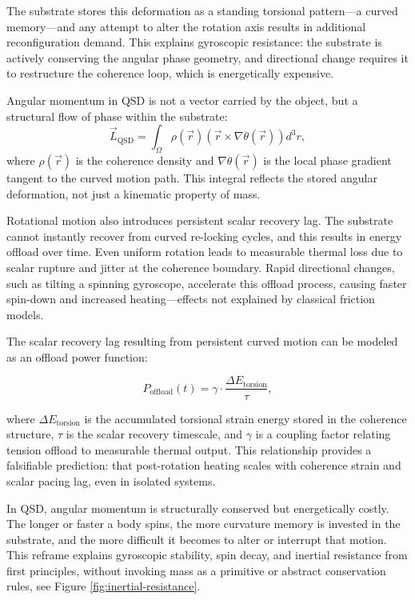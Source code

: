 \documentclass[entropy,article,submit,pdftex,moreauthors]{Definitions/mdpi}
\begin{document}
The substrate stores this deformation as a standing torsional pattern---a curved memory---and any attempt to alter the rotation axis results in additional reconfiguration demand. This explains gyroscopic resistance: the substrate is actively conserving the angular phase geometry, and directional change requires it to restructure the coherence loop, which is energetically expensive.

Angular momentum in QSD is not a vector carried by the object, but a structural flow of phase within the substrate:
\[
\vec{L}_{\text{QSD}} = \int_{\Omega} \rho(\vec{r}) \left( \vec{r} \times \nabla \theta(\vec{r}) \right) d^3r,
\]
where \( \rho(\vec{r}) \) is the coherence density and \( \nabla \theta(\vec{r}) \) is the local phase gradient tangent to the curved motion path. This integral reflects the stored angular deformation, not just a kinematic property of mass.

Rotational motion also introduces persistent scalar recovery lag. The substrate cannot instantly recover from curved re-locking cycles, and this results in energy offload over time. Even uniform rotation leads to measurable thermal loss due to scalar rupture and jitter at the coherence boundary. Rapid directional changes, such as tilting a spinning gyroscope, accelerate this offload process, causing faster spin-down and increased heating—effects not explained by classical friction models.

The scalar recovery lag resulting from persistent curved motion can be modeled as an offload power function:

\begin{equation}
    P_{\text{offload}}(t) = \gamma \cdot \frac{\Delta E_{\text{torsion}}}{\tau},
\end{equation}

where \( \Delta E_{\text{torsion}} \) is the accumulated torsional strain energy stored in the coherence structure, \( \tau \) is the scalar recovery timescale, and \( \gamma \) is a coupling factor relating tension offload to measurable thermal output. This relationship provides a falsifiable prediction: that post-rotation heating scales with coherence strain and scalar pacing lag, even in isolated systems.


In QSD, angular momentum is structurally conserved but energetically costly. The longer or faster a body spins, the more curvature memory is invested in the substrate, and the more difficult it becomes to alter or interrupt that motion. This reframe explains gyroscopic stability, spin decay, and inertial resistance from first principles, without invoking mass as a primitive or abstract conservation rules, see Figure \ref{fig:inertial-resistance}.
\end{document}
